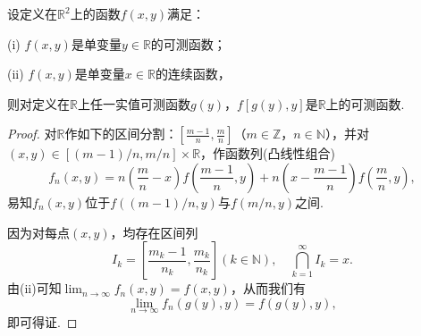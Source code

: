 \documentclass[../../main.tex]{subfiles}
\begin{document}
\begin{theorem}
设定义在\(\mathbb{R}^{2}\)上的函数\(f(x, y)\)满足：

(i) \(f(x, y)\)是单变量\(y \in \mathbb{R}\)的可测函数；

(ii) \(f(x, y)\)是单变量\(x \in \mathbb{R}\)的连续函数，

则对定义在\(\mathbb{R}\)上任一实值可测函数\(g(y)\)，\(f[g(y), y]\)是\(\mathbb{R}\)上的可测函数.
\end{theorem}
\begin{proof}
对\(\mathbb{R}\)作如下的区间分割：\(\left[\frac{m - 1}{n}, \frac{m}{n}\right]\)（\(m \in \mathbb{Z}\)，\(n \in \mathbb{N}\)），并对\((x, y) \in [(m - 1) / n, m / n] \times \mathbb{R}\)，作函数列(凸线性组合)
\[
f_{n}(x, y) = n\left(\frac{m}{n} - x\right)f\left(\frac{m - 1}{n}, y\right) + n\left(x - \frac{m - 1}{n}\right)f\left(\frac{m}{n}, y\right),
\]
易知\(f_{n}(x, y)\)位于\(f((m - 1) / n, y)\)与\(f(m / n, y)\)之间.

因为对每点\((x, y)\)，均存在区间列
\[
I_{k} = \left[\frac{m_{k} - 1}{n_{k}}, \frac{m_{k}}{n_{k}}\right] (k \in \mathbb{N}), \quad \bigcap_{k = 1}^{\infty} I_{k} = x.
\]
由(ii)可知\(\lim_{n \to \infty} f_{n}(x, y) = f(x, y)\)，从而我们有
\[
\lim_{n \to \infty} f_{n}(g(y), y) = f(g(y), y),
\]
即可得证. 

\end{proof}
\end{document}
